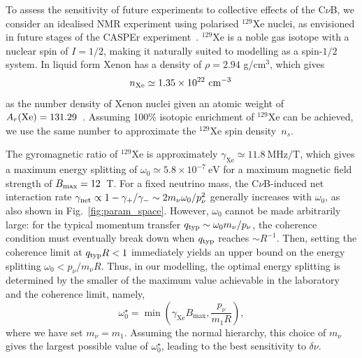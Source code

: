\documentclass[aps,prd,10pt,twocolumn,superscriptaddress,floatfix,nofootinbib,amsmath,amssymb,altaffilletter,preprintnumbers]{revtex4-1}
\begin{document}
To assess the sensitivity of future experiments to collective effects of the C$\nu$B, we consider an idealised NMR experiment using polarised $^{129}$Xe nuclei, as envisioned in future stages of the CASPEr experiment~\cite{Walter:2025ldb}. 
$^{129}$Xe is a noble gas isotope with a nuclear spin of $I = 1/2$, making it naturally suited to modelling as a spin-$1/2$ system. In liquid form Xenon has a density of $\rho = 2.94$ g/cm$^3$, which gives 
\begin{equation}
    n_{\rm Xe}\simeq 1.35 \times 10^{22}~{\rm cm}^{-3}\, 
\end{equation} 
as the number density of Xenon nuclei given an atomic weight of $A_r({\rm Xe})=131.29$~\cite{Prohaska}. 
Assuming 100\% isotopic enrichment of $^{129}$Xe can be achieved, we use the same number to approximate  the $^{129}$Xe spin density~$n_s$. 

The gyromagnetic ratio of $^{129}$Xe is approximately $\gamma_{\text{Xe}} \simeq 11.8~\text{MHz/T}$, which gives a maximum energy splitting of $\omega_0 \simeq 5.8 \times 10^{-7}~\text{eV}$  for a maximum magnetic field strength of $B_{\rm max} = 12$~T. 
For a fixed neutrino mass, the C$\nu$B-induced net interaction rate $\gamma_{\rm net} \propto 1-\gamma_+/\gamma_- \sim 2 m_\nu \omega_0/p_\nu^2$
 generally increases with $\omega_0$, as also shown in Fig.~\ref{fig:param_space}.
  However, $\omega_0$ cannot be made arbitrarily large: for the  typical momentum transfer $q_{\rm typ} \sim \omega_0 m_{\nu}/p_\nu$, the coherence condition must eventually break down  when $q_{\rm typ}$ reaches $\sim R^{-1}$.  Then, setting the coherence limit at $q_{\rm typ}R < 1$ immediately yields an upper bound on the energy splitting $\omega_0 < p_{\nu}/m_{\nu} R$. Thus, in our modelling, the optimal energy splitting is determined by the smaller of the maximum value achievable in the laboratory and the coherence limit, namely, 
\begin{equation}
\omega_0^{\star} = \min\left( \gamma_{\text{Xe}} B_{\text{max}}, \frac{p_{\nu}}{m_1 R} \right),    \label{eq:wo_opt}
\end{equation}
where we have set $m_{\nu}=m_1$.  Assuming the normal hierarchy, this choice of $m_\nu$ gives the largest possible value of $\omega^\star_0$, leading to the best sensitivity to $\delta\nu$.
\end{document}
